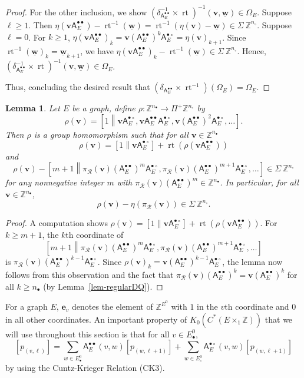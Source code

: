 \documentclass[12pt]{amsbook}%
\newcommand{\rt}{\operatorname{rt}}
\newcommand{\ee}{{\mathbf e}}
\newtheorem{lemma}[theor]{Lemma}
\theoremstyle{defin}
\theoremstyle{remark}
\numberwithin{equation}{chapter}
\numberwithin{theor}{section}
\newcommand{\ZZ}{\mathbb{Z}}
\newcommand{\nsX}{\Sigma\ }
\newcommand{\osX}{\Pi^+}
\newcommand{\oXe}[2]{\left[#1\left\|{#2}\right.\right]}
\newcommand{\regX}{{\bullet}}
\newcommand{\singX}{{\circ}}
\newcommand{\vv}{\mathbf{v}}
\newcommand{\www}{\underline{\mathbf w}}
\newcommand{\nos}{{n_\singX}}
\newcommand{\nor}{{n_\regX}}
\newcommand{\pK}[1]{\pi_{\mathcal R}(#1)}
\newcommand{\adjRR}{\mathsf{A}^{\bullet\bullet}}
\newcommand{\adjRS}{\mathsf{A}^{\bullet\circ}}
\newcommand{\nDT}{\Omega}
\begin{document}
\begin{proof}
For the other inclusion, we show $(\delta_{\adjRR_E}^{-1} \times \rt)^{-1} ( \vv, \www)  \in \nDT_E$.   Suppose $\ell \geq 1$.  Then 
$\eta( \vv \adjRR_E) - \rt^{-1}(\www) = \rt^{-1} (\eta(\vv) - \www ) \in \nsX\ZZ^\nos$.  Suppose $\ell =0$.  For $k \geq 1$, $\eta(\vv \adjRR_E )_k = \vv (\adjRR_E)^{k} \adjRS_E = \eta(\vv)_{k+1}$.  Since $\rt^{-1}(\www)_k = \www_{k+1}$, we have $\eta(\vv \adjRR_E )_k  - \rt^{-1}(\www) \in \nsX\ZZ^\nos$.  Hence, $(\delta_{\adjRR_E}^{-1} \times \rt)^{-1} ( \vv, \www) \in \nDT_E$.
  
Thus, concluding the desired result that $( \delta_{\adjRR_E} \times \rt^{-1} ) (\nDT_E) = \nDT_E$.
\end{proof}
 
 
 
 \begin{lemma}\label{lem-pull-back}
 Let $E$ be a graph, define $\rho \colon \ZZ^{\nor} \to \osX\ZZ^{\nos}$ by 
 \[
 \rho( \vv ) = \oXe{1}{ \vv \adjRS_E, \vv \adjRR_E \adjRS_E , \vv (\adjRR_E)^2 \adjRS_E , \ldots }.
 \]
 Then $\rho$ is a group homomorphism such that for all $\vv \in \ZZ^{\nor}$
 \[
 \rho(\vv)=  \oXe{1}{\vv\adjRS_E}  + \rt(\rho(\vv \adjRR_E ) )
 \]
 and 
 \[
 \rho(\vv) - \oXe{m+1}{  \pK{\vv} (\adjRR_E)^m \adjRS_E ,  \pK{\vv} (\adjRR_E)^{m+1} \adjRS_E , \dots}  \in \nsX\ZZ^{\nos}
 \]
for any nonnegative integer $m$ with $\pK{\vv}(\adjRR_E)^m \in \ZZ^\nor$.  In particular, for all $\vv \in \ZZ^{\nor}$, 
\[
\rho(\vv) - \eta( \pK{\vv}) \in \nsX\ZZ^{\nos}.
\]
 \end{lemma}
 
 \begin{proof}
 A computation shows $\rho(\vv)=  \oXe{1}{\vv\adjRS_E}  + \rt(\rho(\vv \adjRR_E ) )$.  For $k \geq m+1$, the $k$th coordinate of 
 \[
 \oXe{m+1}{  \pK{\vv} (\adjRR_E)^m \adjRS_E ,  \pK{\vv} (\adjRR_E)^{m+1} \adjRS_E , \dots}
 \]  
is $\pK{\vv} (\adjRR_E)^{k-1} \adjRS_E$.  Since $\rho(\vv)_k = \vv (\adjRR_E)^{k-1} \adjRS_E$, the lemma now follows from this observation and the fact that $\pK{\vv} (\adjRR_E)^k = \vv (\adjRR_E)^k$ for all $k \geq \nor$ (by Lemma~\ref{lem-regularDQ}).
 \end{proof}
 
 
 



For a graph $E$, $\ee_v$ denotes the element of $\ZZ^{E^0}$ with $1$ in the $v$th coordinate and $0$ in all other coordinates.  An important property of $K_0(C^*(E \times_1\ZZ))$ that we will use throughout this section is that for all $v \in E^0_\regX$, 
\begin{equation}\label{eq-ck-rel-kthy}
[ p_{(v,\ell) } ] = \sum_{ w \in E^0_\regX} \adjRR_E (v,w) [ p_{(w, \ell+1)} ] + \sum_{ w \in E^0_\singX} \adjRS_E(v,w) [ p_{(w, \ell+1)} ]
\end{equation}
by using the Cuntz-Krieger Relation (CK3).
\end{document}
